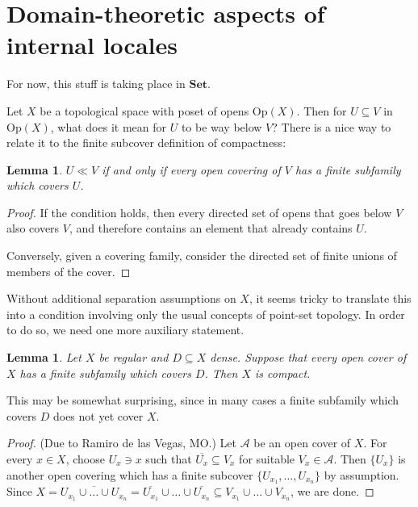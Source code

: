 \documentclass[11pt, oneside, article]{memoir}
\theoremstyle{plain}
\newtheorem{lemma}[theorem]{Lemma}
\theoremstyle{definition}
\theoremstyle{remark}
\newcommand{\Set}[1]{\mathrm{#1}}
\newcommand{\Cat}[1]{\mathbf{#1}}
\newcommand{\smset}{\Cat{Set}}
\newcommand{\Op}{\Set{Op}}
\begin{document}


\section{Domain-theoretic aspects of internal locales}

For now, this stuff is taking place in $\smset$.

Let $X$ be a topological space with poset of opens $\Op(X)$. Then for $U\subseteq V$ in $\Op(X)$, what does it mean for $U$ to be way below $V$? There is a nice way to relate it to the finite subcover definition of compactness:

\begin{lemma}
$U\ll V$ if and only if every open covering of $V$ has a finite subfamily which covers $U$.
\end{lemma}

\begin{proof}
If the condition holds, then every directed set of opens that goes below $V$ also covers $V$, and therefore contains an element that already contains $U$.

Conversely, given a covering family, consider the directed set of finite unions of members of the cover.
\end{proof}

Without additional separation assumptions on $X$, it seems tricky to translate this into a condition involving only the usual concepts of point-set topology. In order to do so, we need one more auxiliary statement.

\newcommand{\cl}[1]{\overline{#1}} %
\newcommand{\intr}[1]{\mathrm{int}(#1)} %

\begin{lemma}
Let $X$ be regular and $D\subseteq X$ dense. Suppose that every open cover of $X$ has a finite subfamily which covers $D$. Then $X$ is compact.
\end{lemma}

This may be somewhat surprising, since in many cases a finite subfamily which covers $D$ does not yet cover $X$.

\begin{proof}(Due to Ramiro de las Vegas, MO.)
Let $\mathcal{A}$ be an open cover of $X$. For every $x\in X$, choose $U_x\ni x$ such that $\cl{U_x}\subseteq V_x$ for suitable $V_x\in\mathcal{A}$. Then $\{U_x\}$ is another open covering which has a finite subcover $\{U_{x_1},\ldots,U_{x_n}\}$ by assumption. Since $X = \cl{U_{x_1}\cup\ldots\cup U_{x_n}} = \cl{U_{x_1}}\cup\ldots\cup\cl{U_{x_n}} \subseteq V_{x_1}\cup\ldots\cup V_{x_n}$, we are done.
\end{proof}
\end{document}
